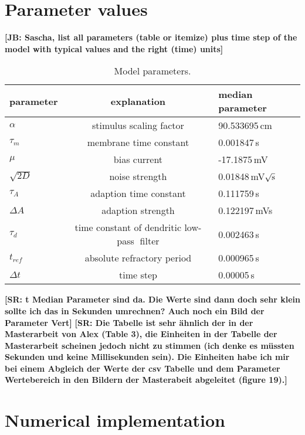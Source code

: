 \documentclass[12pt,a4paper]{article}
\newcommand{\note}[2][]{\textbf{[#1: #2]}}
\begin{document}
\section{Parameter values}

\note[JB]{Sascha, list all parameters (table or itemize) plus time step of the model with typical values and the right (time) units}

\begin{table}[h!]
  \begin{center}
    \caption{Model parameters.}
    \label{tab:table1}
    \begin{tabular}{l|c|l}
      
      parameter & explanation & median parameter \\
      \hline
      $\alpha$  & stimulus scaling factor &  90.533695\,cm \\
      $\tau_{m}$  & membrane time constant &  0.001847\,s\\       
      $\mu$  & bias current &  -17.1875\,mV\\      
      $\sqrt{2D}$  & noise strength &  0.01848\,mV$\sqrt{\textup{s}}$ \\      
      $\tau_{A}$  & adaption time constant &  0.111759\,s\\      
      $\Delta A$  & adaption strength &  0.122197\,mVs\\      
      $\tau_{d}$  & time constant of dendritic low-pass filter &  0.002463\,s\\      
      $t_{ref}$  & absolute refractory period &  0.000965\,s\\     
	  $\Delta t$  & time step &  0.00005\,s\\           
    \end{tabular}
  \end{center}
\end{table}

\note[SR]{t Median Parameter sind da. Die Werte sind dann doch sehr klein sollte ich das in Sekunden umrechnen? Auch noch ein Bild der Parameter Vert}
\note[SR]{Die Tabelle ist sehr ähnlich der in der Masterarbeit von Alex (Table 3), die Einheiten in der Tabelle der Masterarbeit scheinen jedoch nicht zu stimmen (ich denke es müssten Sekunden und keine Millisekunden sein). Die Einheiten habe ich mir bei einem Abgleich der Werte der csv Tabelle und dem Parameter Wertebereich in den Bildern der Masterabeit abgeleitet (figure 19).}




\section{Numerical implementation}
\end{document}
